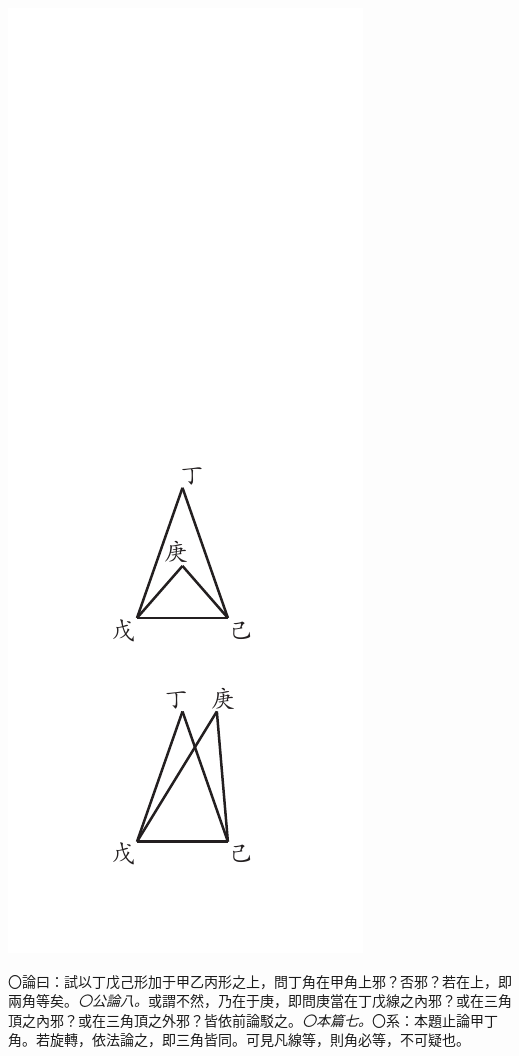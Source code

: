 \documentclass[12pt,b5paper,landscape]{article}
\newcommand{\ccom}[1]{{\footnotesize \emph{〇#1}}}
\newcommand{\bcom}[1]{〇#1}
\begin{document}
\begin{multicols}{2}
\begin{center}
\includegraphics[angle=90]{eu45}
\end{center}
\bcom{論曰：試以丁戊己形加于甲乙丙形之上，問丁角在甲角上邪？否邪？若在上，即兩角等矣。\ccom{公論八。}或謂不然，乃在于庚，即問庚當在丁戊線之內邪？或在三角頂之內邪？或在三角頂之外邪？皆依前論駁之。\ccom{本篇七。}}\bcom{系：本題止論甲丁角。若旋轉，依法論之，即三角皆同。可見凡線等，則角必等，不可疑也。}


\end{multicols}
\end{document}
